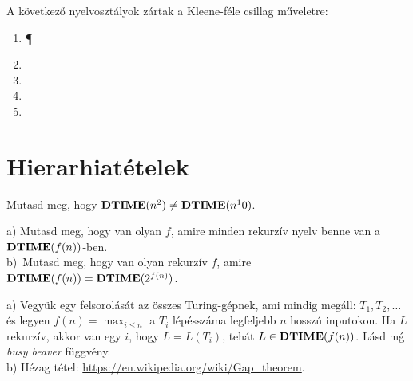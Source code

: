 \begin{Exercise}[counter={sorszam}, difficulty=0]
	A következő nyelvosztályok zártak a Kleene-féle csillag műveletre:
	
	
	\begin{enumerate}
		\item \P
		\item \NP
		\item \ZPP
		\item \NL
		\item \Ppoly
	\end{enumerate}
\end{Exercise}


\section{Hierarhiat\'etelek}

\begin{Exercise}[counter={sorszam}, difficulty=0]
	Mutasd meg, hogy $\mbox{\ensuremath{\mathbf{DTIME}}}(n^2)\ne \mbox{\ensuremath{\mathbf{DTIME}}}(n^10)$.
\end{Exercise}

\begin{Exercise}[counter={sorszam}, difficulty=0]
	a) Mutasd meg, hogy van olyan $f$, amire minden rekurzív nyelv benne van a $\mbox{\ensuremath{\mathbf{DTIME}}}(f(n))$-ben.\\
	b)~\hard Mutasd meg, hogy van olyan rekurz\'iv $f$, amire $\mbox{\ensuremath{\mathbf{DTIME}}}(f(n))=\mbox{\ensuremath{\mathbf{DTIME}}}(2^{f(n)})$.
\end{Exercise}	
\begin{Answer}
	a) Vegy\"uk egy felsorol\'as\'at az \"osszes Turing-g\'epnek, ami mindig meg\'all: $T_1, T_2, \ldots$ \'es legyen $f(n)=\max_{i\le n}$ a $T_i$ l\'ep\'essz\'ama legfeljebb $n$ hossz\'u inputokon. Ha $L$ rekurz\'iv, akkor van egy $i$, hogy $L=L(T_i)$, teh\'at $L\in \mbox{\ensuremath{\mathbf{DTIME}}}(f(n))$.
	L\'asd m\'g \emph{busy beaver} f\"uggv\'eny.\\
	b) H\'ezag t\'etel: \url{https://en.wikipedia.org/wiki/Gap_theorem}.
\end{Answer}

